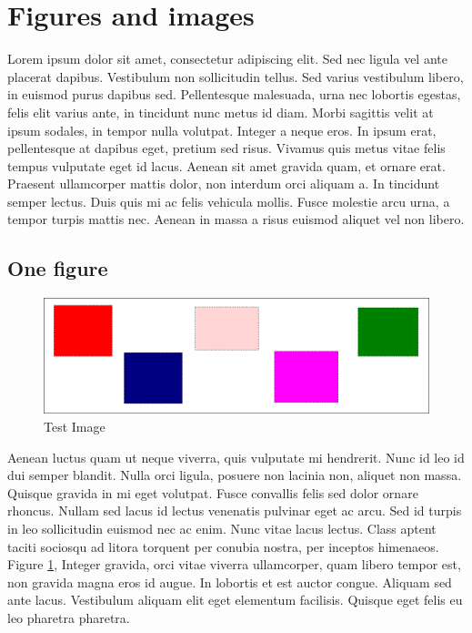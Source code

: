 \section{Figures and images}
Lorem ipsum dolor sit amet, consectetur adipiscing elit. Sed nec ligula vel
ante placerat dapibus. Vestibulum non sollicitudin tellus. Sed varius
vestibulum libero, in euismod purus dapibus sed. Pellentesque malesuada, urna
nec lobortis egestas, felis elit varius ante, in tincidunt nunc metus id diam.
Morbi sagittis velit at ipsum sodales, in tempor nulla volutpat. Integer a
neque eros. In ipsum erat, pellentesque at dapibus eget, pretium sed risus.
Vivamus quis metus vitae felis tempus vulputate eget id lacus. Aenean sit amet
gravida quam, et ornare erat. Praesent ullamcorper mattis dolor, non interdum
orci aliquam a. In tincidunt semper lectus. Duis quis mi ac felis vehicula
mollis. Fusce molestie arcu urna, a tempor turpis mattis nec. Aenean in massa a
risus euismod aliquet vel non libero.

\subsection{One figure}

\begin{figure}[h]
    \centering
    \includegraphics[width=\textwidth]{figures/test_image}
    \caption{Test Image}
    \label{fig:test_image}
\end{figure}

Aenean luctus quam ut neque viverra, quis vulputate mi hendrerit. Nunc id leo
id dui semper blandit. Nulla orci ligula, posuere non lacinia non, aliquet non
massa. Quisque gravida in mi eget volutpat. Fusce convallis felis sed dolor
ornare rhoncus. Nullam sed lacus id lectus venenatis pulvinar eget ac arcu. Sed
id turpis in leo sollicitudin euismod nec ac enim. Nunc vitae lacus lectus.
Class aptent taciti sociosqu ad litora torquent per conubia nostra, per
inceptos himenaeos. Figure \ref{fig:test_image}, Integer gravida, orci vitae
viverra ullamcorper, quam libero tempor est, non gravida magna eros id augue.
In lobortis et est auctor congue. Aliquam sed ante lacus. Vestibulum aliquam
elit eget elementum facilisis. Quisque eget felis eu leo pharetra pharetra.

